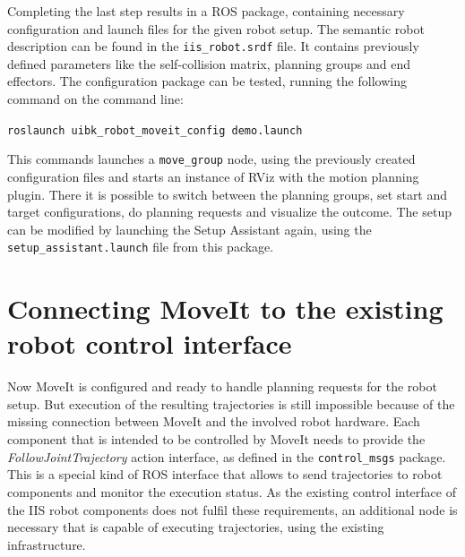 Completing the last step results in a ROS package, containing necessary configuration and launch files for the given robot setup. The semantic robot description can be found in the \texttt{iis\_robot.srdf} file. It contains previously defined parameters like the self-collision matrix, planning groups and end effectors. The configuration package can be tested, running the following command on the command line:
\begin{center}
\texttt{roslaunch uibk\_robot\_moveit\_config demo.launch}
\end{center}
This commands launches a \texttt{move\_group} node, using the previously created configuration files and starts an instance of RViz with the motion planning plugin. There it is possible to switch between the planning groups, set start and target configurations, do planning requests and visualize the outcome. The setup can be modified by launching the Setup Assistant again, using the \texttt{setup\_assistant.launch} file from this package.

\section{Connecting MoveIt to the existing robot control interface}

Now MoveIt is configured and ready to handle planning requests for the robot setup. But execution of the resulting trajectories is still impossible because of the missing connection between MoveIt and the involved robot hardware. Each component that is intended to be controlled by MoveIt needs to provide the \emph{FollowJointTrajectory} action interface, as defined in the \texttt{control\_msgs} package. This is a special kind of ROS interface that allows to send trajectories to robot components and monitor the execution status. As the existing control interface of the IIS robot components does not fulfil these requirements, an additional node is necessary that is capable of executing trajectories, using the existing infrastructure.\\

